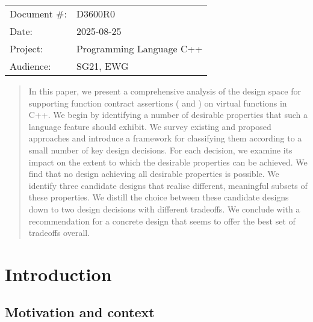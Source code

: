 \begin{tabular}{ll}
Document \#: & D3600R0 \\
Date: &2025-08-25 \\
Project: & Programming Language C++ \\
Audience: & SG21, EWG
\end{tabular}

\begin{abstract}
In this paper, we present a comprehensive analysis of the design space for supporting function contract assertions ( and ) on virtual functions in C++. We begin by identifying a number of desirable properties that such a language feature should exhibit. We survey existing and proposed approaches and introduce a framework for classifying them according to a small number of key design decisions. For each decision, we examine its impact on the extent to which the desirable properties can be achieved. We find that no design achieving all desirable properties is possible. We identify three candidate designs that realise different, meaningful subsets of these properties. We distill the choice between these candidate designs down to two design decisions with different tradeoffs. We conclude with a recommendation for a concrete design that seems to offer the best set of tradeoffs overall.
\end{abstract}


\pagebreak
\tableofcontents*
\pagebreak






\section{Introduction}

\subsection{Motivation and context}

